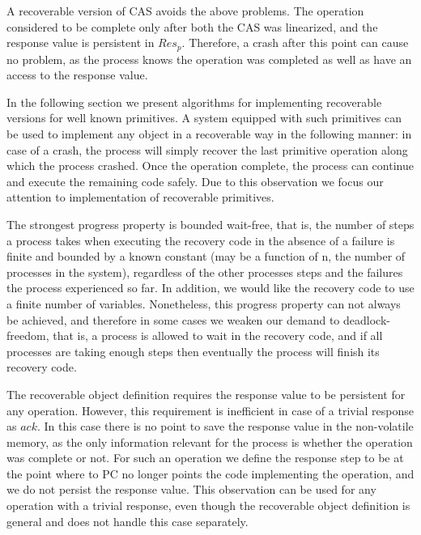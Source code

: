 A recoverable version of CAS avoids the above problems. The operation considered to be complete only after both the CAS was linearized, and the response value is persistent in $Res_p$. Therefore, a crash after this point can cause no problem, as the process knows the operation was completed as well as have an access to the response value.

In the following section we present algorithms for implementing recoverable versions for well known primitives. A system equipped with such primitives can be used to implement any object in a recoverable way in the following manner: in case of a crash, the process will simply recover the last primitive operation along which the process crashed. Once the operation complete, the process can continue and execute the remaining code safely. Due to this observation we focus our attention to implementation of recoverable primitives.

The strongest progress property is bounded wait-free, that is, the number of steps a process takes when executing the recovery code in the absence of a failure is finite and bounded by a known constant (may be a function of n, the number of processes in the system), regardless of the other processes steps and the failures the process experienced so far. In addition, we would like the recovery code to use a finite number of variables.
Nonetheless, this progress property can not always be achieved, and therefore in some cases we weaken our demand to deadlock-freedom, that is, a process is allowed to wait in the recovery code, and if all processes are taking enough steps then eventually the process will finish its recovery code.

The recoverable object definition requires the response value to be persistent for any operation. However, this requirement is inefficient in case of a trivial response as $ack$. In this case there is no point to save the response value in the non-volatile memory, as the only information relevant for the process is whether the operation was complete or not. For such an operation we define the response step to be at the point where to PC no longer points the code implementing the operation, and we do not persist the response value. This observation can be used for any operation with a trivial response, even though the recoverable object definition is general and does not handle this case separately.

